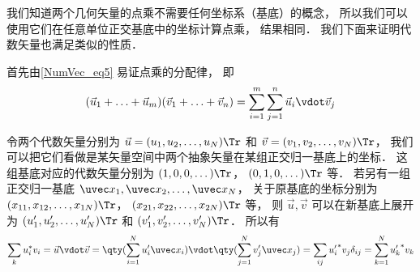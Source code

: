 我们知道两个几何矢量的点乘不需要任何坐标系（基底）的概念， 所以我们可以使用它们在任意单位正交基底中的坐标计算点乘， 结果相同． 我们下面来证明代数矢量也满足类似的性质．

首先由\autoref{NumVec_eq5} 易证点乘的分配律， 即
\begin{equation}
(\vec u_1 + \ldots + \vec u_m)(\vec v_1 + \ldots + \vec v_n) = \sum_{i=1}^m \sum_{j=1}^n \vec u_i \vdot \vec v_j
\end{equation}

令两个代数矢量分别为 $\vec u = (u_1, u_2, \dots, u_N)\Tr$ 和 $\vec v = (v_1, v_2, \dots, v_N)\Tr$， 我们可以把它们看做是某矢量空间中两个抽象矢量在某组正交归一基底上的坐标． 这组基底对应的代数矢量分别为 $(1, 0, 0, \dots)\Tr$， $(0, 1, 0, \dots)\Tr$ 等． 若另有一组正交归一基底 $\uvec x_1, \uvec x_2, \dots, \uvec x_N$， 关于原基底的坐标分别为 $(x_{11}, x_{12}, \dots, x_{1N})\Tr$， $(x_{21}, x_{22}, \dots, x_{2N})\Tr$ 等， 则 $\vec u, \vec v$ 可以在新基底上展开为 $(u'_1, u'_2, \dots, u'_N)\Tr$ 和 $(v'_1, v'_2, \dots, v'_N)\Tr$． 所以有
\begin{equation}
\sum_k u_i^* v_i = \vec u \vdot \vec v = \qty(\sum_{i=1}^N u'_i \uvec x_i)\vdot\qty(\sum_{j=1}^N v'_j \uvec x_j) = \sum_{ij} {u'_i}^* v_j \delta_{ij} = \sum_{k=1}^N {u'_k}^* v_k
\end{equation}







